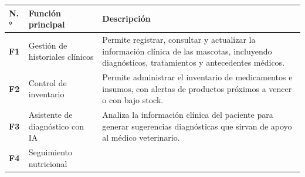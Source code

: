 \documentclass[
]{article}
\newcounter{none} %
\begin{document}
{\def\LTcaptype{none} %
\begin{longtable}[]{@{}
  >{\centering\arraybackslash}p{}
  >{\raggedright\arraybackslash}p{}
  >{\raggedright\arraybackslash}p{}@{}}
\toprule\noalign{}
\begin{minipage}[b]{\linewidth}\centering
\textbf{N.°}
\end{minipage} & \begin{minipage}[b]{\linewidth}\raggedright
\textbf{Función principal}
\end{minipage} & \begin{minipage}[b]{\linewidth}\centering
\textbf{Descripción}
\end{minipage} \\
\midrule\noalign{}
\endhead
\bottomrule\noalign{}
\endlastfoot
\textbf{F1} & \begin{minipage}[t]{\linewidth}\raggedright
Gestión de historiales clínicos
\end{minipage} & \begin{minipage}[t]{\linewidth}\raggedright
Permite registrar, consultar y actualizar la información clínica de las
mascotas, incluyendo diagnósticos, tratamientos y antecedentes médicos.
\end{minipage} \\
\textbf{F2} & \begin{minipage}[t]{\linewidth}\raggedright
Control de inventario
\end{minipage} & \begin{minipage}[t]{\linewidth}\raggedright
Permite administrar el inventario de medicamentos e insumos, con alertas de productos próximos a vencer o con bajo stock.
\end{minipage} \\
\textbf{F3} & \begin{minipage}[t]{\linewidth}\raggedright
Asistente de diagnóstico con IA
\end{minipage} & \begin{minipage}[t]{\linewidth}\raggedright
Analiza la información clínica del paciente para generar sugerencias
diagnósticas que sirvan de apoyo al médico veterinario.
\end{minipage} \\
\textbf{F4} & \begin{minipage}[t]{\linewidth}\raggedright
Seguimiento nutricional
\end{minipage} & \begin{minipage}[t]{\linewidth}\raggedright

\end{minipage}
\end{longtable}}
\end{document}
